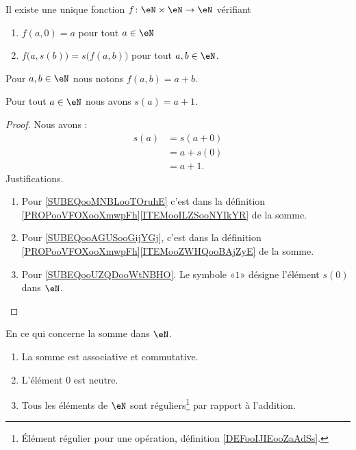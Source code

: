 \begin{propositionDef}      \label{PROPooVFOXooXmwpFh}
	Il existe une unique fonction \( f\colon \eN\times \eN\to \eN\) vérifiant
	\begin{enumerate}
		\item       \label{ITEMooILZSooNYIkYR}
		      \( f(a,0)=a\) pour tout \( a\in \eN\)
		\item       \label{ITEMooZWHQooBAjZyE}
		      \( f\big( a,s(b) \big)=s\big( f(a,b) \big)\) pour tout \( a,b\in \eN\).
	\end{enumerate}
	Pour \( a,b\in \eN\) nous notons \( f(a,b)=a+b\).
\end{propositionDef}

\begin{lemma}      \label{LEMooMJMTooOtUuJT}
	Pour tout \( a\in \eN\) nous avons \( s(a)=a+1\).
\end{lemma}

\begin{proof}
	Nous avons :
	\begin{subequations}
		\begin{align}
			s(a) & =s(a+0)        \label{SUBEQooMNBLooTOruhE} \\
			     & =a+s(0)        \label{SUBEQooAGUSooGijYGj} \\
			     & =a+1.          \label{SUBEQooUZQDooWtNBHO}
		\end{align}
	\end{subequations}
	Justifications.
	\begin{enumerate}
		\item
		      Pour \eqref{SUBEQooMNBLooTOruhE} c'est dans la définition \ref{PROPooVFOXooXmwpFh}\ref{ITEMooILZSooNYIkYR} de la somme.
		\item
		      Pour \eqref{SUBEQooAGUSooGijYGj}, c'est dans la définition \ref{PROPooVFOXooXmwpFh}\ref{ITEMooZWHQooBAjZyE} de la somme.
		\item
		      Pour \eqref{SUBEQooUZQDooWtNBHO}. Le symbole «\( 1\)» désigne l'élément \( s(0)\) dans \( \eN\).
	\end{enumerate}
\end{proof}

\begin{proposition}     \label{PROPooTLTSooGNMTmV}
	En ce qui concerne la somme dans \( \eN\).
	\begin{enumerate}
		\item       \label{ITEMooIFFPooXfftfG}
		      La somme est associative et commutative.
		\item       \label{ITEMooSGRVooPAVFYK}
		      L'élément \( 0\) est neutre.
		\item       \label{ITEMooNUTHooJWWzGv}
		      Tous les éléments de \( \eN\) sont réguliers\footnote{Élément régulier pour une opération, définition \ref{DEFooIJIEooZaAdSs}.} par rapport à l'addition.
	\end{enumerate}
\end{proposition}

